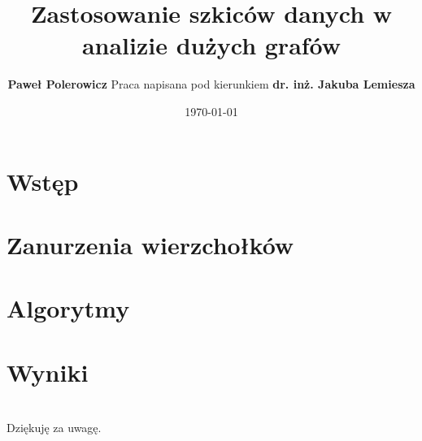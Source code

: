 \documentclass{beamer}
\title{Zastosowanie szkiców danych w analizie dużych grafów}
\author{
	\textbf{Paweł Polerowicz}
	\newline \newline
	Praca napisana pod kierunkiem \textbf{dr. inż. Jakuba Lemiesza}
}
\date{\today}
\begin{document}
\begin{frame}[plain]{}
	\titlepage
\end{frame}


 \section{Wstęp}
 
 

 \section{Zanurzenia wierzchołków}
 
 
 \section{Algorytmy}
 
 
 

 \section{Wyniki}
 
 
 
 


\section{}
\begin{frame}{}
	\begin{center}
		\large{Dziękuję za uwagę.}
	\end{center}
\end{frame}
\end{document}
